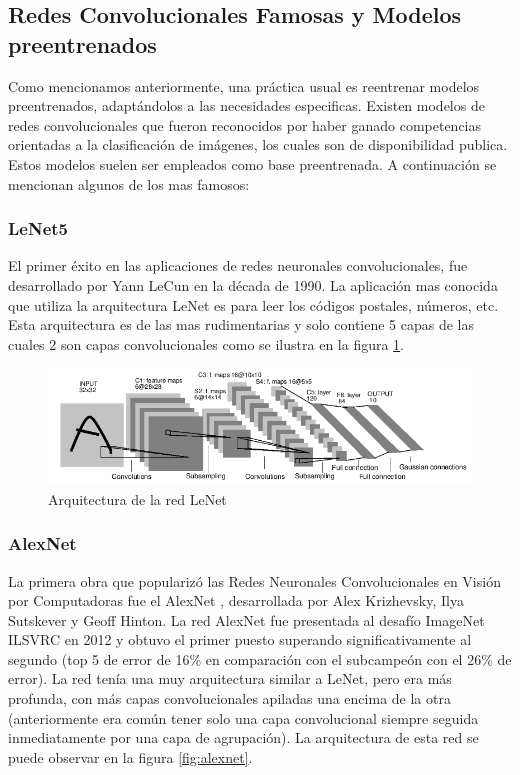 \documentclass[a4paper,11pt,spanish]{book}
\begin{document}
      
      \subsection{Redes Convolucionales Famosas y Modelos preentrenados} \label{sec:cnn_famosas}
	Como mencionamos anteriormente, una práctica usual es reentrenar modelos preentrenados, adaptándolos a las necesidades especificas. 
	Existen modelos de redes convolucionales que fueron reconocidos por haber ganado competencias orientadas a la clasificación de imágenes, 
	los cuales son de disponibilidad publica. Estos modelos suelen ser empleados como base 
	preentrenada. A continuación se mencionan algunos de los mas famosos:
	
	\subsubsection{LeNet5}
	  El primer éxito en las aplicaciones de redes neuronales convolucionales, fue desarrollado por Yann LeCun \cite{Lecun:LeNet} en la década de 1990.
	  La aplicación mas conocida que utiliza la arquitectura LeNet es para leer los códigos postales, números, etc. Esta arquitectura es de las mas rudimentarias y 
	  solo contiene 5 capas de las cuales 2 son capas convolucionales como se ilustra en la figura \ref{fig:lenet}. 
	  
	  \begin{figure}[h]
	    \begin{center}
	    \includegraphics[width=0.6\linewidth]{./img/lenet.png}
	    \end{center}
	    \caption{Arquitectura de la red LeNet}
	    \label{fig:lenet}
	  \end{figure}

	\subsubsection{AlexNet} \label{sec:alexnet}
	  La primera obra que popularizó las Redes Neuronales Convolucionales en Visión por Computadoras fue el AlexNet  \cite{AlexNet}, desarrollada por Alex Krizhevsky, 
	  Ilya Sutskever y Geoff Hinton.
	  La red AlexNet fue presentada al desafío ImageNet ILSVRC  en 2012 y obtuvo el primer puesto superando significativamente al segundo (top 5 de error de 16\% en
	  comparación con el subcampeón con el 26\% de error). 
	  La red tenía una muy arquitectura similar a LeNet, pero era más profunda, con más  capas convolucionales apiladas una encima de la otra
	  (anteriormente era común tener solo una capa convolucional siempre seguida inmediatamente por una capa de agrupación). La arquitectura de esta red se puede observar en la figura 
	  \ref{fig:alexnet}.
	  
\end{document}
